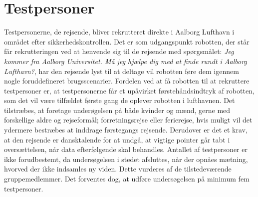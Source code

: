 \section{Testpersoner}
\label{ParametreTestpersoner}
%
Testpersonerne, de rejsende, bliver rekrutteret direkte i Aalborg Lufthavn i området efter sikkerhedskontrollen. Det er som udgangspunkt robotten, der står får rekrutteringen ved at henvende sig til de rejsende med spørgsmålet: \textit{Jeg kommer fra Aalborg Universitet. Må jeg hjælpe dig med at finde rundt i Aalborg Lufthavn?}, har den rejsende lyst til at deltage vil robotten føre dem igennem nogle foruddefineret brugsscenarier. Fordelen ved at få robotten til at rekruttere testpersoner er, at testpersonerne får et upåvirket førstehåndsindtryk af robotten, som det vil være tilfældet første gang de oplever robotten i lufthavnen. \blankline 
%
Det tilstræbes, at foretage underøgelsen på både kvinder og mænd, gerne med forskellige aldre og rejseformål; forretningsrejse eller ferierejse, hvis muligt vil det ydermere bestræbes at inddrage førstegangs rejsende. Derudover er det et krav, at den rejsende er dansktalende for at undgå, at vigtige pointer går tabt i oversættelsen, når data efterfølgende skal behandles. Antallet af testpersoner er ikke forudbestemt, da undersøgelsen i stedet afsluttes, når der opnåes mætning, hvorved der ikke indsamles ny viden. Dette vurderes af de tilstedeværende gruppemedlemmer. Det forventes dog, at udføre undersøgelsen på minimum fem testpersoner.     